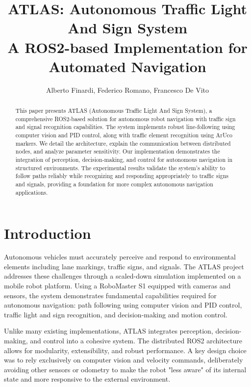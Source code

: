 \documentclass[9pt,technote]{IEEEtran}
\begin{document}
\title{ATLAS: Autonomous Traffic Light And Sign System\\
\Large A ROS2-based Implementation for Automated Navigation}

\author{Alberto Finardi, Federico Romano, Francesco De Vito}
\maketitle

\begin{abstract}
This paper presents ATLAS (Autonomous Traffic Light And Sign System), a comprehensive ROS2-based solution for autonomous robot navigation with traffic sign and signal recognition capabilities. The system implements robust line-following using computer vision and PID control, along with traffic element recognition using ArUco markers. We detail the architecture, explain the communication between distributed nodes, and analyze parameter sensitivity. Our implementation demonstrates the integration of perception, decision-making, and control for autonomous navigation in structured environments. The experimental results validate the system's ability to follow paths reliably while recognizing and responding appropriately to traffic signs and signals, providing a foundation for more complex autonomous navigation applications.
\end{abstract}

\section{Introduction}
Autonomous vehicles must accurately perceive and respond to environmental elements including lane markings, traffic signs, and signals. The ATLAS project addresses these challenges through a scaled-down simulation implemented on a mobile robot platform. Using a RoboMaster S1 equipped with cameras and sensors, the system demonstrates fundamental capabilities required for autonomous navigation: path following using computer vision and PID control, traffic light and sign recognition, and decision-making and motion control.

Unlike many existing implementations, ATLAS integrates perception, decision-making, and control into a cohesive system. The distributed ROS2 architecture allows for modularity, extensibility, and robust performance. A key design choice was to rely exclusively on computer vision and velocity commands, deliberately avoiding other sensors or odometry to make the robot "less aware" of its internal state and more responsive to the external environment.
\end{document}
